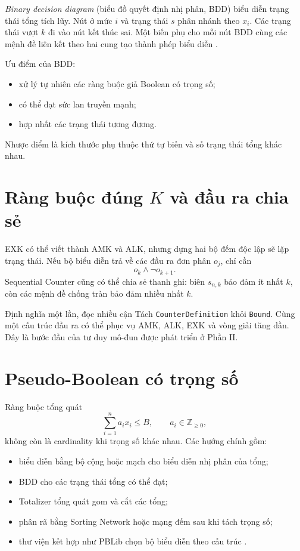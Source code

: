 \emph{Binary decision diagram} (biểu đồ quyết định nhị phân, BDD) biểu diễn
trạng thái tổng tích lũy. Nút ở mức \(i\) và trạng thái \(s\) phân nhánh theo
\(x_i\). Các trạng thái vượt \(k\) đi vào nút kết thúc sai. Một biến phụ cho
mỗi nút BDD cùng các mệnh đề liên kết theo hai cung tạo thành phép biểu diễn
\parencite{bryant1986bdd,abio2012bdd}.

Ưu điểm của BDD:
\begin{itemize}
  \item xử lý tự nhiên các ràng buộc giả Boolean có trọng số;
  \item có thể đạt sức lan truyền mạnh;
  \item hợp nhất các trạng thái tương đương.
\end{itemize}
Nhược điểm là kích thước phụ thuộc thứ tự biến và số trạng thái tổng khác nhau.

\section{Ràng buộc đúng \(K\) và đầu ra chia sẻ}

EXK có thể viết thành AMK và ALK, nhưng dựng hai bộ đếm độc lập sẽ lặp trạng
thái. Nếu bộ biểu diễn trả về các đầu ra đơn phân \(o_j\), chỉ cần
\[
  o_k\land\neg o_{k+1}.
\]
Sequential Counter cũng có thể chia sẻ thanh ghi: biên \(s_{n,k}\) bảo đảm ít
nhất \(k\), còn các mệnh đề chống tràn bảo đảm nhiều nhất \(k\).

\begin{keyidea}{Định nghĩa một lần, đọc nhiều cận}
Tách \texttt{CounterDefinition} khỏi \texttt{Bound}. Cùng một cấu trúc đầu ra
có thể phục vụ AMK, ALK, EXK và vòng giải tăng dần. Đây là bước đầu của tư duy
mô-đun được phát triển ở Phần II.
\end{keyidea}

\section{Pseudo-Boolean có trọng số}

Ràng buộc tổng quát
\[
  \sum_{i=1}^{n}a_ix_i\le B,
  \qquad a_i\in\mathbb Z_{\ge0},
\]
không còn là cardinality khi trọng số khác nhau. Các hướng chính gồm:
\begin{itemize}
  \item biểu diễn bằng bộ cộng hoặc mạch cho biểu diễn nhị phân của tổng;
  \item BDD cho các trạng thái tổng có thể đạt;
  \item Totalizer tổng quát gom và cắt các tổng;
  \item phân rã bằng Sorting Network hoặc mạng đếm sau khi tách trọng số;
  \item thư viện kết hợp như PBLib chọn bộ biểu diễn theo cấu trúc
        \parencite{een2006pb,philipp2015pblib}.
\end{itemize}

